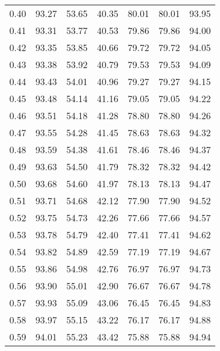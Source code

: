 \begin{tabular}{|c|c|c|c|c|c|c|}
      0.40 &     93.27 &     53.65 &      40.35 &   80.01 &      80.01 &         93.95 \\
      0.41 &     93.31 &     53.77 &      40.53 &   79.86 &      79.86 &         94.00 \\
      0.42 &     93.35 &     53.85 &      40.66 &   79.72 &      79.72 &         94.05 \\
      0.43 &     93.38 &     53.92 &      40.79 &   79.53 &      79.53 &         94.09 \\
      0.44 &     93.43 &     54.01 &      40.96 &   79.27 &      79.27 &         94.15 \\
      0.45 &     93.48 &     54.14 &      41.16 &   79.05 &      79.05 &         94.22 \\
      0.46 &     93.51 &     54.18 &      41.28 &   78.80 &      78.80 &         94.26 \\
      0.47 &     93.55 &     54.28 &      41.45 &   78.63 &      78.63 &         94.32 \\
      0.48 &     93.59 &     54.38 &      41.61 &   78.46 &      78.46 &         94.37 \\
      0.49 &     93.63 &     54.50 &      41.79 &   78.32 &      78.32 &         94.42 \\
      0.50 &     93.68 &     54.60 &      41.97 &   78.13 &      78.13 &         94.47 \\
      0.51 &     93.71 &     54.68 &      42.12 &   77.90 &      77.90 &         94.52 \\
      0.52 &     93.75 &     54.73 &      42.26 &   77.66 &      77.66 &         94.57 \\
      0.53 &     93.78 &     54.79 &      42.40 &   77.41 &      77.41 &         94.62 \\
      0.54 &     93.82 &     54.89 &      42.59 &   77.19 &      77.19 &         94.67 \\
      0.55 &     93.86 &     54.98 &      42.76 &   76.97 &      76.97 &         94.73 \\
      0.56 &     93.90 &     55.01 &      42.90 &   76.67 &      76.67 &         94.78 \\
      0.57 &     93.93 &     55.09 &      43.06 &   76.45 &      76.45 &         94.83 \\
      0.58 &     93.97 &     55.15 &      43.22 &   76.17 &      76.17 &         94.88 \\
      0.59 &     94.01 &     55.23 &      43.42 &   75.88 &      75.88 &         94.94 \\

\end{tabular}
